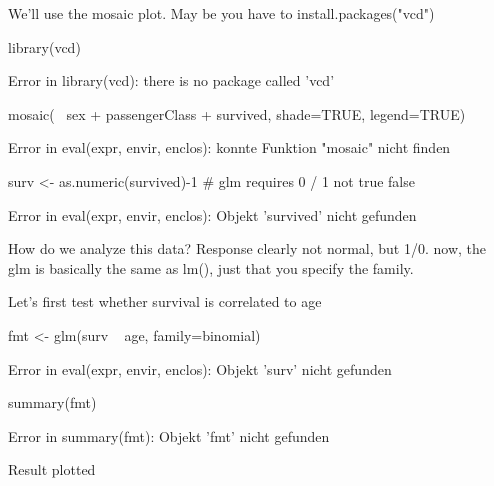 \documentclass[a4paper,twoside]{tufte-book}\usepackage[]{graphicx}\usepackage[]{color}
\begin{document}
{\begin{appendices}
We'll use the mosaic plot. May be you have to install.packages("vcd")

\begin{Schunk}
\begin{Sinput}
library(vcd)
\end{Sinput}
\begin{Soutput}
Error in library(vcd): there is no package called 'vcd'
\end{Soutput}
\begin{Sinput}
mosaic(~ sex + passengerClass + survived, shade=TRUE, legend=TRUE) 
\end{Sinput}
\begin{Soutput}
Error in eval(expr, envir, enclos): konnte Funktion "mosaic" nicht finden
\end{Soutput}
\begin{Sinput}
surv <- as.numeric(survived)-1 # glm requires 0 / 1 not true false
\end{Sinput}
\begin{Soutput}
Error in eval(expr, envir, enclos): Objekt 'survived' nicht gefunden
\end{Soutput}
\end{Schunk}

How do we analyze this data? Response clearly not normal, but 1/0. now, the glm is basically the same as lm(), just that you specify the family.

Let's first test whether survival is correlated to age

\begin{Schunk}
\begin{Sinput}
fmt <- glm(surv ~ age, family=binomial)
\end{Sinput}
\begin{Soutput}
Error in eval(expr, envir, enclos): Objekt 'surv' nicht gefunden
\end{Soutput}
\begin{Sinput}
summary(fmt)
\end{Sinput}
\begin{Soutput}
Error in summary(fmt): Objekt 'fmt' nicht gefunden
\end{Soutput}
\end{Schunk}

Result plotted 


\end{appendices}}
\end{document}
